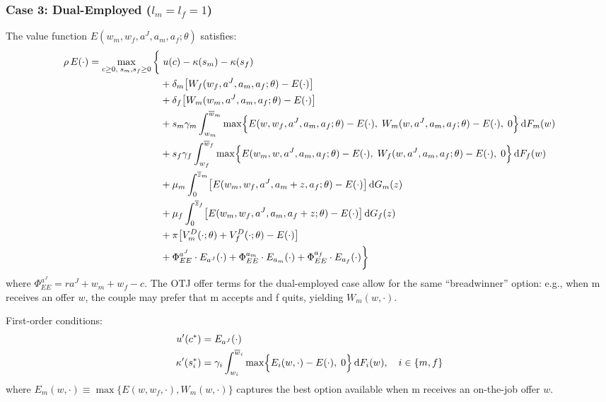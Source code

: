 \documentclass[11pt]{article}
\newcommand{\aJ}{a^{J}}
\newcommand{\dF}{\,\mathrm{d}F}
\newcommand{\dG}{\,\mathrm{d}G}
\begin{document}
\subsubsection{Case 3: Dual-Employed ($l_m = l_f = 1$)}

The value function $E(w_m, w_f, \aJ, a_m, a_f;\theta)$ satisfies:
\begin{align}
    \rho\, E(\cdot) = \max_{c \geq 0,\; s_m,s_f \geq 0} \bigg\{
    &\; u(c) - \kappa(s_m) - \kappa(s_f) \notag\\
    &+ \delta_m \bigl[W_f(w_f, \aJ, a_m, a_f;\theta) - E(\cdot)\bigr] \notag\\
    &+ \delta_f \bigl[W_m(w_m, \aJ, a_m, a_f;\theta) - E(\cdot)\bigr] \notag\\
    &+ s_m \gamma_m \int_{w_m}^{\overline{w}_m} \max\Bigl\{
        E(w, w_f, \aJ, a_m, a_f;\theta) - E(\cdot),\;
        W_m(w, \aJ, a_m, a_f;\theta) - E(\cdot),\; 0
    \Bigr\} \dF_m(w) \notag\\
    &+ s_f \gamma_f \int_{w_f}^{\overline{w}_f} \max\Bigl\{
        E(w_m, w, \aJ, a_m, a_f;\theta) - E(\cdot),\;
        W_f(w, \aJ, a_m, a_f;\theta) - E(\cdot),\; 0
    \Bigr\} \dF_f(w) \notag\\
    &+ \mu_m \int_0^{\overline{z}_m} \bigl[E(w_m, w_f, \aJ, a_m + z, a_f;\theta) - E(\cdot)\bigr] \dG_m(z) \notag\\
    &+ \mu_f \int_0^{\overline{z}_f} \bigl[E(w_m, w_f, \aJ, a_m, a_f + z;\theta) - E(\cdot)\bigr] \dG_f(z) \notag\\
    &+ \pi \bigl[V_m^D(\cdot;\theta) + V_f^D(\cdot;\theta) - E(\cdot)\bigr] \notag\\
    &+ \Phi^{\aJ}_{EE} \cdot E_{\aJ}(\cdot)
     + \Phi^{a_m}_{EE} \cdot E_{a_m}(\cdot)
     + \Phi^{a_f}_{EE} \cdot E_{a_f}(\cdot)
    \bigg\}
    \label{eq:HJB_EE}
\end{align}
where $\Phi^{\aJ}_{EE} = r\aJ + w_m + w_f - c$. The OTJ offer terms for the dual-employed case allow for the same ``breadwinner'' option: e.g., when m receives an offer $w$, the couple may prefer that m accepts and f quits, yielding $W_m(w, \cdot)$.

First-order conditions:
\begin{align}
    u'(c^*) &= E_{\aJ}(\cdot) \\
    \kappa'(s_i^*) &= \gamma_i \int_{w_i}^{\overline{w}_i} \max\Bigl\{E_i(w, \cdot) - E(\cdot),\; 0\Bigr\} \dF_i(w), \quad i \in \{m,f\}
\end{align}
where $E_m(w, \cdot) \equiv \max\{E(w, w_f, \cdot), W_m(w, \cdot)\}$ captures the best option available when m receives an on-the-job offer $w$.
\end{document}
